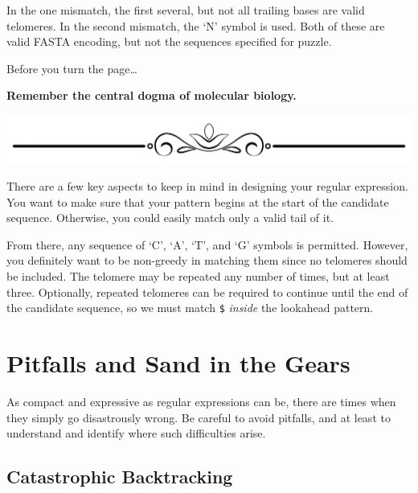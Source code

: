 In the one mismatch, the first several, but not all trailing bases are
valid telomeres. In the second mismatch, the `N' symbol is used. Both of
these are valid FASTA encoding, but not the sequences specified for
puzzle.

Before you turn the page\ldots{}

\textbf{Remember the central dogma of molecular biology.}

\includegraphics{images/Elegant-Flourish-Frame-Extrapolated-19.svg}

\newpage

There are a few key aspects to keep in mind in designing your regular
expression. You want to make sure that your pattern begins at the start
of the candidate sequence. Otherwise, you could easily match only a
valid tail of it.

From there, any sequence of `C', `A', `T', and `G' symbols is permitted.
However, you definitely want to be non-greedy in matching them since no
telomeres should be included. The telomere may be repeated any number of
times, but at least three. Optionally, repeated telomeres can be
required to continue until the end of the candidate sequence, so we must
match \texttt{\$} \emph{inside} the lookahead pattern.

\begin{Shaded}
\begin{Highlighting}[]
\OperatorTok{=} 
\end{Highlighting}
\end{Shaded}

\hypertarget{pitfalls-and-sand-in-the-gears}{%
\chapter{Pitfalls and Sand in the
Gears}\label{pitfalls-and-sand-in-the-gears}}

As compact and expressive as regular expressions can be, there are times
when they simply go disastrously wrong. Be careful to avoid pitfalls,
and at least to understand and identify where such difficulties arise.

\newpage

\hypertarget{catastrophic-backtracking}{%
\section{Catastrophic Backtracking}\label{catastrophic-backtracking}}

